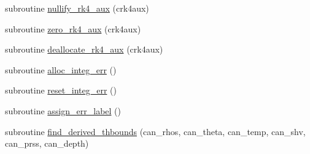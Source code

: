 \begin{DoxyCompactItemize}
\item 
subroutine \hyperlink{namespacerk4__coms_a306ba21ba388b2e51767aa9f5d76eda0}{nullify\+\_\+rk4\+\_\+aux} (crk4aux)
\item 
subroutine \hyperlink{namespacerk4__coms_a0af8d3f6d5452c98c81c5230f3b22343}{zero\+\_\+rk4\+\_\+aux} (crk4aux)
\item 
subroutine \hyperlink{namespacerk4__coms_a5af13b35af38a83aed0e367f7053ffc3}{deallocate\+\_\+rk4\+\_\+aux} (crk4aux)
\item 
subroutine \hyperlink{namespacerk4__coms_a8266a2612a37eea2fc3106633e25f954}{alloc\+\_\+integ\+\_\+err} ()
\item 
subroutine \hyperlink{namespacerk4__coms_aa58f2e011f087e610d94022bed90be7a}{reset\+\_\+integ\+\_\+err} ()
\item 
subroutine \hyperlink{namespacerk4__coms_ae49c70a18c8dfa81befa51bc5244ab8c}{assign\+\_\+err\+\_\+label} ()
\item 
subroutine \hyperlink{namespacerk4__coms_ae622426587059dbf68f96f24c502091a}{find\+\_\+derived\+\_\+thbounds} (can\+\_\+rhos, can\+\_\+theta, can\+\_\+temp,                                                                                                                                                                                                                                                   can\+\_\+shv, can\+\_\+prss, can\+\_\+depth)
\end{DoxyCompactItemize}
